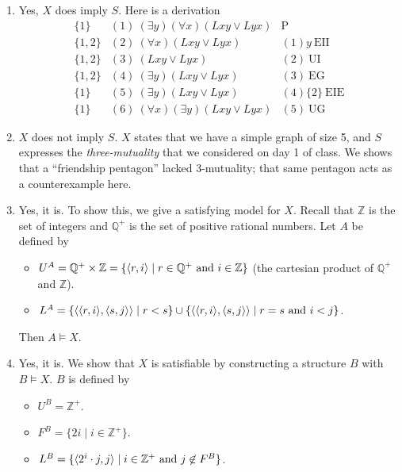 \begin{mdframed}[linewidth=1]
\begin{enumerate}
    \item Yes, $X$ does imply $S$. Here is a derivation
    \[
\begin{array}{lll}
\{1\}   & (1)\ (\exists y)(\forall x)(Lxy \vee Lyx)  & \mathrm{P}\\
\{1, 2\} & (2)\ (\forall x)(Lxy \vee Lyx) & (1)y\ \mathrm{EII}\\
\{1, 2\} & (3)\ (Lxy \vee Lyx) & (2)\ \mathrm{UI}\\
\{1, 2\} & (4)\ (\exists y)(Lxy \vee Lyx) & (3)\ \mathrm{EG}\\
\{1\} & (5)\ (\exists y)(Lxy \vee Lyx) & (4)\{2\}\ \mathrm{EIE}\\
\{1\} & (6)\ (\forall x)(\exists y)(Lxy \vee Lyx) & (5)\ \mathrm{UG}
\end{array}
\]

    \item $X$ does not imply $S$. $X$ states that we have a simple graph of size 5, and $S$ expresses the \emph{three-mutuality} that we considered on day 1 of class. We shows that a ``friendship pentagon'' lacked 3-mutuality; that same pentagon acts as a counterexample here. 

    \item Yes, it is. To show this, we give a satisfying model for $X$. Recall that $\mathbb{Z}$ is the set of integers and $\mathbb{Q}^+$ is the set of positive rational numbers. Let $A$ be defined by
    \begin{itemize}
    \item
    $U^A= \mathbb{Q}^+\times\mathbb{Z}=\{\mbox{$\langle r,i \rangle$}\mid r\in\mathbb{Q}^+\mbox{ and}\ i\in \mathbb{Z}\}$ (the cartesian product of $\mathbb{Q}^+$ and $\mathbb{Z}$).
    \item
    $L^A=\{\mbox{$\langle \mbox{$\langle r,i \rangle$},\mbox{$\langle s,j \rangle$} \rangle$}\mid r<s\}\cup\{\mbox{$\langle \mbox{$\langle r,i \rangle$},\mbox{$\langle s,j \rangle$} \rangle$}\mid r=s\mbox{ and }i<j\}$.
    \end{itemize}

    Then $A \models X$. 

    \item Yes, it is. We show that $X$ is satisfiable by constructing a structure $B$ with $B\models X$. $B$ is defined by
    \begin{itemize}
    \item
    $U^B= \mathbb{Z}^+$.
    \item
    $F^B=\{2i\mid i\in\mathbb{Z}^+\}$.
    \item
    $L^B = \{\mbox{$\langle 2^i\cdot j,j \rangle$}\mid i\in\mathbb{Z}^+\mbox{ and } j\not\in F^B\}$.
    \end{itemize}

\end{enumerate}
\end{mdframed}